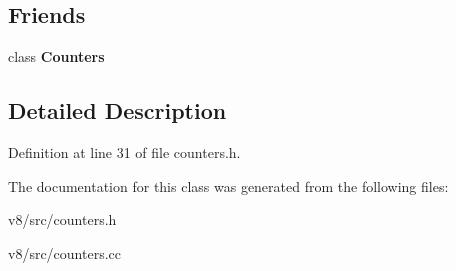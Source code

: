 \subsection*{Friends}
\begin{DoxyCompactItemize}
\item 
\mbox{\label{classv8_1_1internal_1_1StatsTable_a5545327f141103b96b160ddc48274bc0}} 
class {\bfseries Counters}
\end{DoxyCompactItemize}


\subsection{Detailed Description}


Definition at line 31 of file counters.\+h.



The documentation for this class was generated from the following files\+:\begin{DoxyCompactItemize}
\item 
v8/src/counters.\+h\item 
v8/src/counters.\+cc\end{DoxyCompactItemize}
